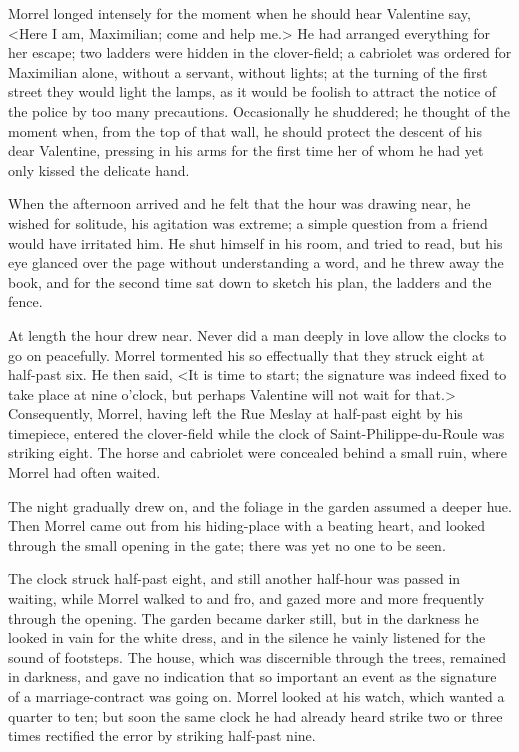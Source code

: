  Morrel longed intensely for the moment when he should hear Valentine say, <Here I am, Maximilian; come and help me.> He had arranged everything for her escape; two ladders were hidden in the clover-field; a cabriolet was ordered for Maximilian alone, without a servant, without lights; at the turning of the first street they would light the lamps, as it would be foolish to attract the notice of the police by too many precautions. Occasionally he shuddered; he thought of the moment when, from the top of that wall, he should protect the descent of his dear Valentine, pressing in his arms for the first time her of whom he had yet only kissed the delicate hand. 

 When the afternoon arrived and he felt that the hour was drawing near, he wished for solitude, his agitation was extreme; a simple question from a friend would have irritated him. He shut himself in his room, and tried to read, but his eye glanced over the page without understanding a word, and he threw away the book, and for the second time sat down to sketch his plan, the ladders and the fence. 

 At length the hour drew near. Never did a man deeply in love allow the clocks to go on peacefully. Morrel tormented his so effectually that they struck eight at half-past six. He then said, <It is time to start; the signature was indeed fixed to take place at nine o'clock, but perhaps Valentine will not wait for that.> Consequently, Morrel, having left the Rue Meslay at half-past eight by his timepiece, entered the clover-field while the clock of Saint-Philippe-du-Roule was striking eight. The horse and cabriolet were concealed behind a small ruin, where Morrel had often waited. 

 The night gradually drew on, and the foliage in the garden assumed a deeper hue. Then Morrel came out from his hiding-place with a beating heart, and looked through the small opening in the gate; there was yet no one to be seen. 

 The clock struck half-past eight, and still another half-hour was passed in waiting, while Morrel walked to and fro, and gazed more and more frequently through the opening. The garden became darker still, but in the darkness he looked in vain for the white dress, and in the silence he vainly listened for the sound of footsteps. The house, which was discernible through the trees, remained in darkness, and gave no indication that so important an event as the signature of a marriage-contract was going on. Morrel looked at his watch, which wanted a quarter to ten; but soon the same clock he had already heard strike two or three times rectified the error by striking half-past nine. 

